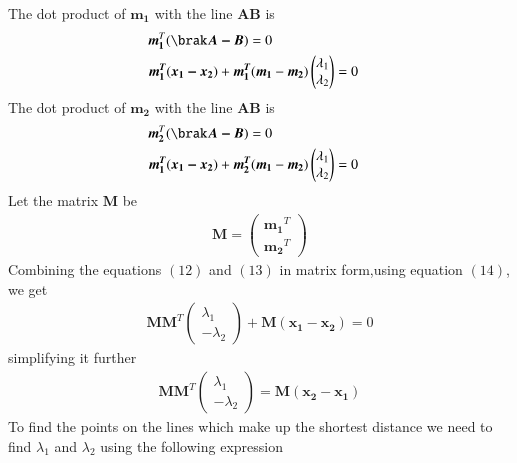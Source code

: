 \documentclass[journal,12pt,twocolumn]{IEEEtran}
\begin{document}
The dot product of $\bm{m_1}$ with the line $\bm{AB}$ is
\begin{align}
    \bm{m_1}^T(\brak\bm{A-B})=0\notag\\
    \bm{m_1^T}(\bm{x_1-x_2})+\bm{m_1^T}(\bm{m_1} & -\bm{m_2})\begin{pmatrix}\lambda_1 \\ \lambda_2\end{pmatrix}=0
\end{align}
The dot product of $\bm{m_2}$ with the line $\bm{AB}$ is\\
\begin{align}
    \bm{m_2}^T(\brak\bm{A-B})=0\notag\\
    \bm{m_1^T}(\bm{x_1-x_2})+\bm{m_2^T}(\bm{m_1} & -\bm{m_2})\begin{pmatrix}\lambda_1 \\ \lambda_2\end{pmatrix}=0
\end{align}
\vspace{3mm}
Let the matrix $\bm{M}$ be\\
\begin{align}
    \bm{M}=\begin{pmatrix}\bm{m_1}^T\\\bm{m_2}^T\end{pmatrix}
\end{align}
Combining the equations $(12)$ and $(13)$ in matrix form,using equation $(14)$, we get\\
\begin{align}
    \bm{M}\bm{M}^T\begin{pmatrix}\lambda_1\\-\lambda_2\end{pmatrix}+\bm{M}\bm{(x_1-x_2)}=0
\end{align}
simplifying it further\\
\begin{align}
    \bm{M}\bm{M}^T\begin{pmatrix}\lambda_1\\-\lambda_2\end{pmatrix}=\bm{M}\bm{(x_2-x_1)}
\end{align}
To find the points on the lines which make up the shortest distance we need to find $\lambda_1$ and $\lambda_2$ using the following expression\\
\end{document}
